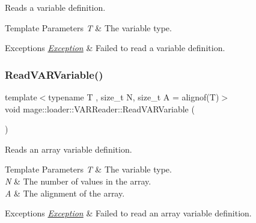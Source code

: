 Reads a variable definition.


\begin{DoxyTemplParams}{Template Parameters}
{\em T} & The variable type. \\
\hline
\end{DoxyTemplParams}

\begin{DoxyExceptions}{Exceptions}
{\em \mbox{\hyperlink{classmage_1_1_exception}{Exception}}} & Failed to read a variable definition. \\
\hline
\end{DoxyExceptions}
\mbox{\label{classmage_1_1loader_1_1_v_a_r_reader_aa27db2b3ba9c66dbdd2c75c6aba1848c}} 
\subsubsection{\texorpdfstring{Read\+V\+A\+R\+Variable()}{ReadVARVariable()}\hspace{0.1cm}{\footnotesize\ttfamily [2/2]}}
{\footnotesize\ttfamily template$<$typename T , size\+\_\+t N, size\+\_\+t A = alignof(\+T)$>$ \\
void mage\+::loader\+::\+V\+A\+R\+Reader\+::\+Read\+V\+A\+R\+Variable (\begin{DoxyParamCaption}{ }\end{DoxyParamCaption})\hspace{0.3cm}{\ttfamily [private]}}

Reads an array variable definition.


\begin{DoxyTemplParams}{Template Parameters}
{\em T} & The variable type. \\
\hline
{\em N} & The number of values in the array. \\
\hline
{\em A} & The alignment of the array. \\
\hline
\end{DoxyTemplParams}

\begin{DoxyExceptions}{Exceptions}
{\em \mbox{\hyperlink{classmage_1_1_exception}{Exception}}} & Failed to read an array variable definition. \\
\hline
\end{DoxyExceptions}


